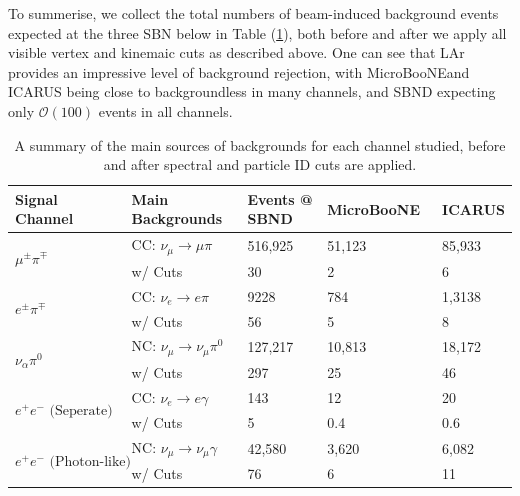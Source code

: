 \documentclass[11pt, a4paper]{article}
\def\muboone{MicroBooNE}
\begin{document}
To summerise, we collect the total numbers of beam-induced background events expected at the three SBN below in Table (\ref{tab:Rates}), both before and after we apply all visible vertex and kinemaic cuts as described above. One can see that LAr provides an impressive level of background rejection, with \muboone and ICARUS being close to backgroundless in many channels, and SBND expecting only $\mathcal{O}(100)$ events in all channels.

\begin{table}[t]
\centering
\begin{tabular}{ l | l | l| l | l}
	Signal Channel & Main Backgrounds & Events @ SBND & \muboone\ & ICARUS \\
\hline\hline
\multirow{2}{*}{$\mu^\pm \pi^\mp$} & CC: $\nu_\mu  \rightarrow \mu \pi  $ & 516,925  & 51,123 & 85,933\\
													 & w/ Cuts &30 & 2 & 6 \\ \hline
\multirow{2}{*}{$ e^\pm \pi^\mp$} & CC: $\nu_e  \rightarrow e \pi  $ & 9228  & 784 & 1,3138\\
													 & w/ Cuts &56 & 5 & 8 \\ \hline
\multirow{2}{*}{$ \nu_\alpha \pi^0$} & NC: $\nu_\mu  \rightarrow \nu_\mu \pi^0 $ &  127,217 & 10,813 & 18,172\\
													 & w/ Cuts &297 & 25 & 46 \\ \hline
 \multirow{2}{*}{$ e^+e^- \text{ (Seperate)} $} & CC: $\nu_e  \rightarrow e \gamma  $ &  143 & 12 & 20\\
													 & w/ Cuts &5 & 0.4 & 0.6 \\ \hline
  \multirow{2}{*}{$ e^+ e^- \text{ (Photon-like)}$} & NC: $\nu_\mu  \rightarrow \nu_\mu \gamma $ &  42,580 & 3,620 & 6,082\\
													 & w/ Cuts &76 & 6 & 11 \\ 
 \hline \hline

\end{tabular}
\caption{\label{tab:Rates} A summary of the main sources of backgrounds for each channel studied, before and after spectral and particle ID cuts are applied. }
\end{table}
\end{document}
